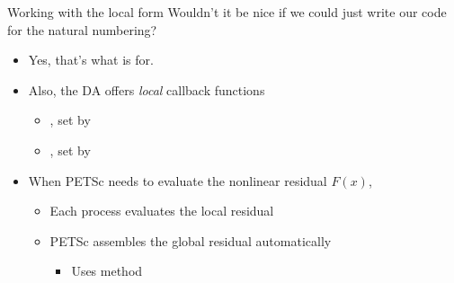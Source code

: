 \begin{frame}{Working with the local form}
  Wouldn't it be nice if we could just write our code for the natural numbering?
  \begin{itemize}
  \item Yes, that's what  is for.
  \item Also, the DA offers \emph{local} callback functions
    \begin{itemize}
    \item {}, set by 
      
      \medskip
      
    \item {}, set by 
    \end{itemize}

    \bigskip

  \item When PETSc needs to evaluate the nonlinear residual $F(x)$,
    \begin{itemize}
    \item Each process evaluates the local residual

      \medskip

    \item PETSc assembles the global residual automatically
      \begin{itemize}
      \item Uses  method
      \end{itemize}
    \end{itemize}
  \end{itemize}
\end{frame}
